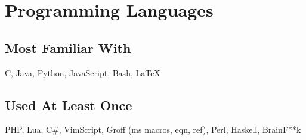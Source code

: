 \documentclass[9pt]{extarticle}
\begin{document}
    \section{Programming Languages}
    \subsection{Most Familiar With}
    C, Java, Python, JavaScript, Bash, \LaTeX
    \subsection{Used At Least Once}
    PHP, Lua, C\#, VimScript, Groff (ms macros, eqn, ref), Perl, Haskell, BrainF**k
\end{document}
